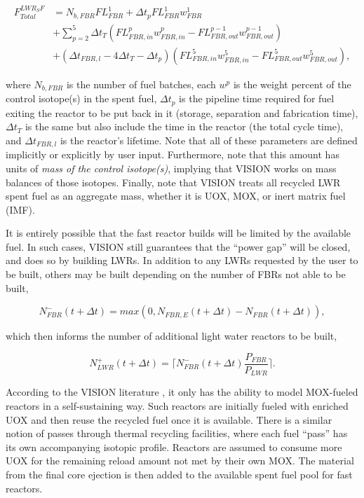 \begin{equation}
\begin{aligned}
F^{LWR_SF}_{Total} & = N_{b,FBR} FL^1_{FBR} + \Delta t_p FL^1_{FBR} w^1_{FBR} \\
                   & + \sum_{p=2}^{5} \Delta t_T (FL^p_{FBR,in} w^p_{FBR,in} - FL^{p-1}_{FBR,out} w^{p-1}_{FBR,out}) \\
                   & + (\Delta t_{FBR,l} - 4 \Delta t_T - \Delta t_p) (FL^5_{FBR,in} w^5_{FBR,in} - FL^{5}_{FBR,out} w^{5}_{FBR,out}),
\end{aligned}
\end{equation}

where $N_{b,FBR}$ is the number of fuel batches, each $w^p$ is the weight
percent of the control isotope(s) in the spent fuel, $\Delta t_p$ is the
pipeline time required for fuel exiting the reactor to be put back in it
(storage, separation and fabrication time), $\Delta t_T$ is the same but also
include the time in the reactor (the total cycle time), and $\Delta t_{FBR,l}$
is the reactor's lifetime. Note that all of these parameters are defined
implicitly or explicitly by user input. Furthermore, note that this amount has
units of \textit{mass of the control isotope(s)}, implying that VISION works on
mass balances of those isotopes. Finally, note that VISION treats all recycled
LWR spent fuel as an aggregate mass, whether it is UOX, MOX, or inert matrix
fuel (IMF).

It is entirely possible that the fast reactor builds will be limited by the
available fuel. In such cases, VISION still guarantees that the ``power gap''
will be closed, and does so by building LWRs. In addition to any LWRs requested
by the user to be built, others may be built depending on the number of FBRs not
able to be built,

\begin{equation}
N^-_{FBR}\left(t+\Delta t\right) = 
                        max(0,N_{FBR,E}\left(t+\Delta t\right) - 
                        N_{FBR}\left(t+\Delta t\right)),
\end{equation}

which then informs the number of additional light water reactors to be built,

\begin{equation}
N^+_{LWR}\left(t+\Delta t\right) = \lceil N^-_{FBR}\left(t+\Delta t\right) 
                        \frac{P_{FBR}}{P_{LWR}} \rceil .
\end{equation}

According to the VISION literature \cite{schweitzer_improved_2008}, it only has
the ability to model MOX-fueled reactors in a self-sustaining way. Such reactors
are initially fueled with enriched UOX and then reuse the recycled fuel once it
is available. There is a similar notion of passes through thermal recycling
facilities, where each fuel ``pass'' has its own accompanying isotopic
profile. Reactors are assumed to consume more UOX for the remaining reload
amount not met by their own MOX. The material from the final core ejection is
then added to the available spent fuel pool for fast reactors.

